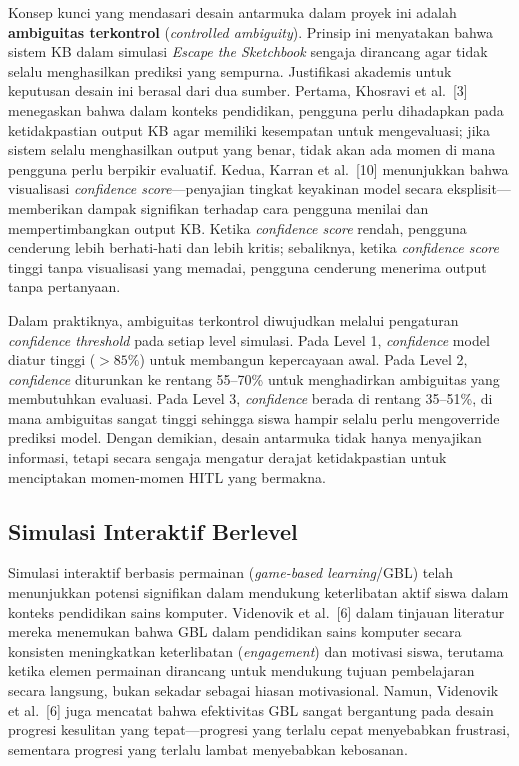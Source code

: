 \documentclass[10pt,twoside,openright]{report}
\begin{document}
Konsep kunci yang mendasari desain antarmuka dalam proyek ini adalah \textbf{ambiguitas terkontrol} (\textit{controlled ambiguity}). Prinsip ini menyatakan bahwa sistem KB dalam simulasi \textit{Escape the Sketchbook} sengaja dirancang agar tidak selalu menghasilkan prediksi yang sempurna. Justifikasi akademis untuk keputusan desain ini berasal dari dua sumber. Pertama, Khosravi et al.\ [3] menegaskan bahwa dalam konteks pendidikan, pengguna perlu dihadapkan pada ketidakpastian output KB agar memiliki kesempatan untuk mengevaluasi; jika sistem selalu menghasilkan output yang benar, tidak akan ada momen di mana pengguna perlu berpikir evaluatif. Kedua, Karran et al.\ [10] menunjukkan bahwa visualisasi \textit{confidence score}---penyajian tingkat keyakinan model secara eksplisit---memberikan dampak signifikan terhadap cara pengguna menilai dan mempertimbangkan output KB. Ketika \textit{confidence score} rendah, pengguna cenderung lebih berhati-hati dan lebih kritis; sebaliknya, ketika \textit{confidence score} tinggi tanpa visualisasi yang memadai, pengguna cenderung menerima output tanpa pertanyaan.

Dalam praktiknya, ambiguitas terkontrol diwujudkan melalui pengaturan \textit{confidence threshold} pada setiap level simulasi. Pada Level 1, \textit{confidence} model diatur tinggi ($>85\%$) untuk membangun kepercayaan awal. Pada Level 2, \textit{confidence} diturunkan ke rentang 55--70\% untuk menghadirkan ambiguitas yang membutuhkan evaluasi. Pada Level 3, \textit{confidence} berada di rentang 35--51\%, di mana ambiguitas sangat tinggi sehingga siswa hampir selalu perlu mengoverride prediksi model. Dengan demikian, desain antarmuka tidak hanya menyajikan informasi, tetapi secara sengaja mengatur derajat ketidakpastian untuk menciptakan momen-momen HITL yang bermakna.

\subsection{Simulasi Interaktif Berlevel}
\label{subsec:simulasi-interaktif}

Simulasi interaktif berbasis permainan (\textit{game-based learning}/GBL) telah menunjukkan potensi signifikan dalam mendukung keterlibatan aktif siswa dalam konteks pendidikan sains komputer. Videnovik et al.\ [6] dalam tinjauan literatur mereka menemukan bahwa GBL dalam pendidikan sains komputer secara konsisten meningkatkan keterlibatan (\textit{engagement}) dan motivasi siswa, terutama ketika elemen permainan dirancang untuk mendukung tujuan pembelajaran secara langsung, bukan sekadar sebagai hiasan motivasional. Namun, Videnovik et al.\ [6] juga mencatat bahwa efektivitas GBL sangat bergantung pada desain progresi kesulitan yang tepat---progresi yang terlalu cepat menyebabkan frustrasi, sementara progresi yang terlalu lambat menyebabkan kebosanan.
\end{document}
